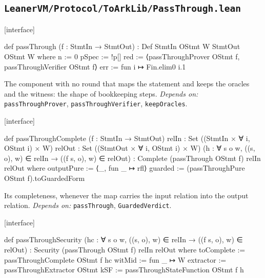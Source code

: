 \subsection{\texttt{LeanerVM/Protocol/ToArkLib/PassThrough.lean}}\label{sec:gen-cat-spine-PassThrough}

\par\medskip\noindent\textbf{}\hfill\textsf{\small [interface]}\par\nopagebreak

\begin{leancode}
def passThrough (f : StmtIn → StmtOut) : Def StmtIn OStmt W StmtOut OStmt W where
  n := 0
  pSpec := !p[]
  red := ⟨passThroughProver OStmt f, passThroughVerifier OStmt f⟩
  err := fun i ↦ Fin.elim0 i.1
\end{leancode}


The component with no round that maps the statement and keeps the oracles and the witness: the shape of bookkeeping steps. \emph{Depends on:} \texttt{passThroughProver}, \texttt{passThroughVerifier}, \texttt{keepOracles}.

\par\medskip\noindent\textbf{}\hfill\textsf{\small [interface]}\par\nopagebreak

\begin{leancode}
def passThroughComplete (f : StmtIn → StmtOut)
    {relIn : Set ((StmtIn × ∀ i, OStmt i) × W)} {relOut : Set ((StmtOut × ∀ i, OStmt i) × W)}
    (h : ∀ s o w, ((s, o), w) ∈ relIn → ((f s, o), w) ∈ relOut) :
    Complete (passThrough OStmt f) relIn relOut where
  outputPure := ⟨_, fun _ ↦ rfl⟩
  guarded := (passThroughPure OStmt f).toGuardedForm
\end{leancode}


Its completeness, whenever the map carries the input relation into the output relation. \emph{Depends on:} \texttt{passThrough}, \texttt{GuardedVerdict}.

\par\medskip\noindent\textbf{}\hfill\textsf{\small [interface]}\par\nopagebreak

\begin{leancode}
def passThroughSecurity (hc : ∀ s o w, ((s, o), w) ∈ relIn → ((f s, o), w) ∈ relOut) :
    Security (passThrough OStmt f) relIn relOut where
  toComplete := passThroughComplete OStmt f hc
  witMid := fun _ ↦ W
  extractor := passThroughExtractor OStmt
  kSF := passThroughStateFunction OStmt f h
\end{leancode}

